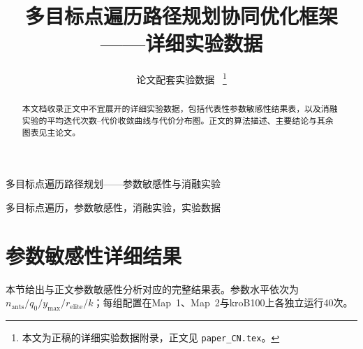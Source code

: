 \documentclass[lettersize,journal]{IEEEtran}
\begin{document}
\title{多目标点遍历路径规划协同优化框架——详细实验数据}

\author{论文配套实验数据~%
\thanks{本文为正稿的详细实验数据附录，正文见 \texttt{paper\_CN.tex}。}}

%
{多目标点遍历路径规划——参数敏感性与消融实验}

\maketitle

\begin{abstract}
本文档收录正文中不宜展开的详细实验数据，包括代表性参数敏感性结果表，以及消融实验的平均迭代次数--代价收敛曲线与代价分布图。正文的算法描述、主要结论与其余图表见主论文。
\end{abstract}

\begin{IEEEkeywords}
多目标点遍历，参数敏感性，消融实验，实验数据
\end{IEEEkeywords}

\section{参数敏感性详细结果}
\label{sec:sens}

本节给出与正文参数敏感性分析对应的完整结果表。参数水平依次为$n_{\mathrm{ants}}/q_0/y_{\max}/r_{\mathrm{elite}}/k$；每组配置在Map~1、Map~2与kroB100上各独立运行40次。
\end{document}
